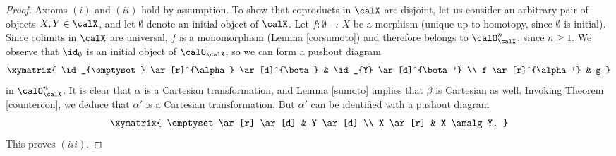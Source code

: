 \begin{proof}
Axioms $(i)$ and $(ii)$ hold by assumption.
To show that coproducts in $\calX$ are disjoint, let us consider an arbitrary pair of objects
$X, Y \in \calX$, and let $\emptyset$ denote an initial object of $\calX$. Let $f: \emptyset \rightarrow X$ be a morphism (unique up to homotopy, since $\emptyset$ is initial). Since
colimits in $\calX$ are universal, $f$ is a monomorphism (Lemma \ref{corsumoto}) and therefore belongs to
$\calO_{\calX}^{n}$, since $n \geq 1$. We observe that
$\id_{\emptyset}$ is an initial object of $\calO_{\calX}$, so we can form a pushout diagram
$$ \xymatrix{ \id_{\emptyset} \ar[r]^{\alpha} \ar[d]^{\beta} & \id_{Y} \ar[d]^{\beta'}  \\
f \ar[r]^{\alpha'} & g }$$
in $\calO^{n}_{\calX}$. It is clear that $\alpha$ is a Cartesian transformation, and Lemma \ref{sumoto} implies that $\beta$ is Cartesian as well. Invoking Theorem \ref{countercon}, we deduce that $\alpha'$ is
a Cartesian transformation. But $\alpha'$ can be identified with a pushout diagram
$$ \xymatrix{ \emptyset \ar[r] \ar[d] & Y \ar[d] \\
X \ar[r] & X \amalg Y. }$$
This proves $(iii)$. 


\end{proof}
